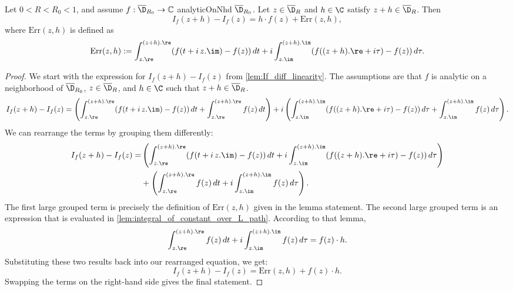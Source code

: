\begin{lemma}\label{lem:If_diff_decomposition_final}
\leanok
Let $0<R<R_0<1$, and assume $f:\overline{\D}_{R_0}\to\mathbb{C}$ analyticOnNhd $\overline{\D}_{R_0}$. Let $z \in \overline{\D}_R$ and $h\in\C$ satisfy $z+h \in \overline{\D}_R$. Then
\[ I_f(z+h)-I_f(z) = h \cdot f(z) + \mathrm{Err}(z,h), \]
where $\mathrm{Err}(z,h)$ is defined as
\[ \mathrm{Err}(z,h) := \int_{z.\re}^{(z+h).\re} (f(t + i\,z.\im) - f(z))\,dt + i \int_{z.\im}^{(z+h).\im} (f((z+h).\re + i\tau) - f(z))\,d\tau. \]
\end{lemma}
\begin{proof}
\leanok
We start with the expression for $I_f(z+h)-I_f(z)$ from \cref{lem:If_diff_linearity}. The assumptions are that $f$ is analytic on a neighborhood of $\overline{\D}_{R_0}$, $z \in \overline{\D}_R$, and $h \in \C$ such that $z+h \in \overline{\D}_R$.
\[
I_f(z+h)-I_f(z) = \left( \int_{z.\re}^{(z+h).\re} (f(t + i\,z.\im) - f(z))\,dt + \int_{z.\re}^{(z+h).\re} f(z)\,dt \right) + i \left( \int_{z.\im}^{(z+h).\im} (f((z+h).\re + i\tau) - f(z))\,d\tau + \int_{z.\im}^{(z+h).\im} f(z)\,d\tau \right).
\]
We can rearrange the terms by grouping them differently:
\begin{align*}
I_f(z+h)-I_f(z) = &\left( \int_{z.\re}^{(z+h).\re} (f(t + i\,z.\im) - f(z))\,dt + i \int_{z.\im}^{(z+h).\im} (f((z+h).\re + i\tau) - f(z))\,d\tau \right)\\
&+ \left( \int_{z.\re}^{(z+h).\re} f(z)\,dt + i \int_{z.\im}^{(z+h).\im} f(z)\,d\tau \right).
\end{align*}
The first large grouped term is precisely the definition of $\mathrm{Err}(z,h)$ given in the lemma statement.
The second large grouped term is an expression that is evaluated in \cref{lem:integral_of_constant_over_L_path}. According to that lemma,
\[ \int_{z.\re}^{(z+h).\re} f(z)\,dt + i \int_{z.\im}^{(z+h).\im} f(z)\,d\tau = f(z) \cdot h. \]
Substituting these two results back into our rearranged equation, we get:
\[ I_f(z+h)-I_f(z) = \mathrm{Err}(z,h) + f(z) \cdot h. \]
Swapping the terms on the right-hand side gives the final statement.
\end{proof}


